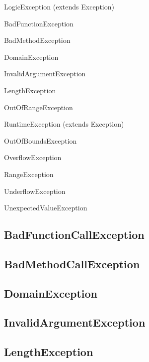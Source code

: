 \begin{compactitem}
\item LogicException (extends Exception)

\begin{compactitem}
\item BadFunctionException
\begin{compactitem}
\item BadMethodException
\end{compactitem}
\item DomainException
\item InvalidArgumentException
\item LengthException
\item OutOfRangeException
\end{compactitem}

\item RuntimeException (extends Exception)

\begin{compactitem}
\item OutOfBoundsException
\item OverflowException
\item RangeException
\item UnderflowException
\item UnexpectedValueException
\end{compactitem}
\end{compactitem}

\subsection{BadFunctionCallException}


\subsection{BadMethodCallException}


\subsection{DomainException}


\subsection{InvalidArgumentException}


\subsection{LengthException}


